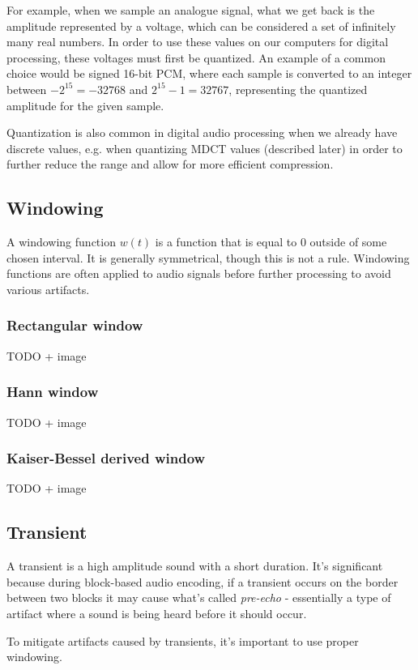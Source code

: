 For example, when we sample an analogue signal, what we get back is the amplitude represented by a voltage, which can be considered a set of infinitely many real numbers. In order to use these values on our computers for digital processing, these voltages must first be quantized. \cite{bosi_goldberg_2003} An example of a common choice would be signed 16-bit PCM, where each sample is converted to an integer between $-2^{15} = -32768$ and $2^{15}-1 = 32767$, representing the quantized amplitude for the given sample.

Quantization is also common in digital audio processing when we already have discrete values, e.g. when quantizing MDCT values (described later) in order to further reduce the range and allow for more efficient compression.

\subsection{Windowing}
A windowing function $w(t)$ is a function that is equal to $0$ outside of some chosen interval. It is generally symmetrical, though this is not a rule. Windowing functions are often applied to audio signals before further processing to avoid various artifacts.

\subsubsection{Rectangular window}
TODO + image

\subsubsection{Hann window}
TODO + image

\subsubsection{Kaiser-Bessel derived window}
TODO + image

\subsection{Transient}
A transient is a high amplitude sound with a short duration. It's significant because during block-based audio encoding, if a transient occurs on the border between two blocks it may cause what's called \emph{pre-echo} - essentially a type of artifact where a sound is being heard before it should occur.

To mitigate artifacts caused by transients, it's important to use proper windowing.

